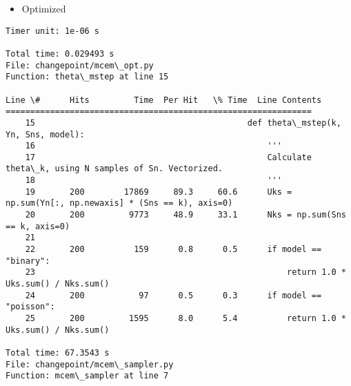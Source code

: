 \documentclass{article}
\begin{document}
    \begin{itemize}
\itemsep1pt\parskip0pt
\item
  Optimized
\end{itemize}


    \begin{Verbatim}[commandchars=\\\{\}]
Timer unit: 1e-06 s

Total time: 0.029493 s
File: changepoint/mcem\_opt.py
Function: theta\_mstep at line 15

Line \#      Hits         Time  Per Hit   \% Time  Line Contents
==============================================================
    15                                           def theta\_mstep(k, Yn, Sns, model):
    16                                               '''
    17                                               Calculate theta\_k, using N samples of Sn. Vectorized.
    18                                               '''
    19       200        17869     89.3     60.6      Uks = np.sum(Yn[:, np.newaxis] * (Sns == k), axis=0)
    20       200         9773     48.9     33.1      Nks = np.sum(Sns == k, axis=0)
    21                                           
    22       200          159      0.8      0.5      if model == "binary":
    23                                                   return 1.0 * Uks.sum() / Nks.sum()
    24       200           97      0.5      0.3      if model == "poisson":
    25       200         1595      8.0      5.4          return 1.0 * Uks.sum() / Nks.sum()

Total time: 67.3543 s
File: changepoint/mcem\_sampler.py
Function: mcem\_sampler at line 7


\end{Verbatim}
\end{document}
